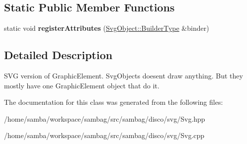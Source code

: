 \subsection*{Static Public Member Functions}
\begin{DoxyCompactItemize}
\item 
\hypertarget{classsambag_1_1disco_1_1svg_1_1_svg_object_a3491876592666a552c937661cc21aca0}{
static void {\bfseries registerAttributes} (\hyperlink{classsambag_1_1xml_1_1_x_m_l2_object}{SvgObject::BuilderType} \&binder)}
\label{classsambag_1_1disco_1_1svg_1_1_svg_object_a3491876592666a552c937661cc21aca0}

\end{DoxyCompactItemize}


\subsection{Detailed Description}
SVG version of GraphicElement. SvgObjects doesent draw anything. But they mostly have one GraphicElement object that do it. 

The documentation for this class was generated from the following files:\begin{DoxyCompactItemize}
\item 
/home/samba/workspace/sambag/src/sambag/disco/svg/Svg.hpp\item 
/home/samba/workspace/sambag/src/sambag/disco/svg/Svg.cpp\end{DoxyCompactItemize}
